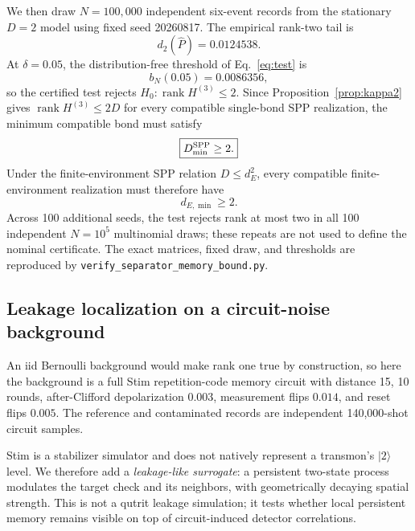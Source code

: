 \documentclass[11pt]{article}
\newcommand{\rank}{\operatorname{rank}}
\begin{document}
We then draw $N=100{,}000$ independent six-event records from the stationary $D=2$ model using fixed seed 20260817. The empirical rank-two tail is
\begin{equation}
    d_2(\widehat P)=0.0124538.
\end{equation}
At $\delta=0.05$, the distribution-free threshold of Eq.~\eqref{eq:test} is
\begin{equation}
    b_N(0.05)=0.0086356,
\end{equation}
so the certified test rejects $H_0:\rank H^{(3)}\le2$. Since Proposition~\ref{prop:kappa2} gives $\rank H^{(3)}\le2D$ for every compatible single-bond SPP realization, the minimum compatible bond must satisfy
\begin{equation}
    \boxed{D_{\min}^{\rm SPP}\ge2.}
    \label{eq:workedDbound}
\end{equation}
Under the finite-environment SPP relation $D\le d_E^2$, every compatible finite-environment realization must therefore have
\begin{equation}
    \boxed{d_{E,\min}\ge2.}
    \label{eq:workeddEbound}
\end{equation}
Across 100 additional seeds, the test rejects rank at most two in all 100 independent $N=10^5$ multinomial draws; these repeats are not used to define the nominal certificate. The exact matrices, fixed draw, and thresholds are reproduced by \texttt{verify\_separator\_memory\_bound.py}.

\subsection{Leakage localization on a circuit-noise background}
\label{sec:leak}

An iid Bernoulli background would make rank one true by construction, so here the background is a full Stim repetition-code memory circuit with distance 15, 10 rounds, after-Clifford depolarization $0.003$, measurement flips $0.014$, and reset flips $0.005$. The reference and contaminated records are independent 140,000-shot circuit samples.

Stim is a stabilizer simulator and does not natively represent a transmon's $|2\rangle$ level. We therefore add a \emph{leakage-like surrogate}: a persistent two-state process modulates the target check and its neighbors, with geometrically decaying spatial strength. This is not a qutrit leakage simulation; it tests whether local persistent memory remains visible on top of circuit-induced detector correlations.
\end{document}
